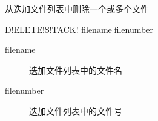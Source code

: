 \label{sss:deletestack}

从迭加文件列表中删除一个或多个文件

\begin{SACSTX}
D!ELETE!S!TACK! filename|filenumber
\end{SACSTX}

\begin{description}
\item [filename] 迭加文件列表中的文件名
\item [filenumber] 迭加文件列表中的文件号
\end{description}
